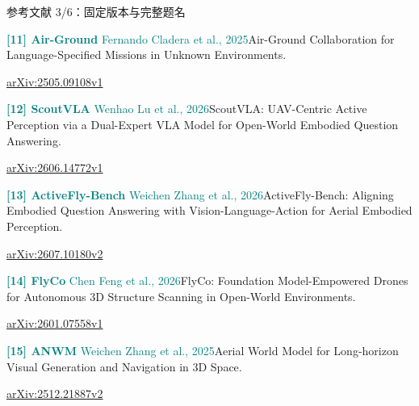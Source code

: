 \documentclass[aspectratio=169,10pt]{beamer}
\def\slidesource{}
\begin{document}
\begin{frame}[t,label=refs3]{参考文献 3/6：固定版本与完整题名}
\relax
{\fontsize{8.3}{10.6}\selectfont
\par\textcolor{teal}{\textbf{[11] Air-Ground} Fernando Cladera et al., 2025}\quad Air-Ground Collaboration for Language-Specified Missions in Unknown Environments.\par\href{https://arxiv.org/html/2505.09108v1}{arXiv:2505.09108v1}\par\vspace{1.8mm}
\par\textcolor{teal}{\textbf{[12] ScoutVLA} Wenhao Lu et al., 2026}\quad ScoutVLA: UAV-Centric Active Perception via a Dual-Expert VLA Model for Open-World Embodied Question Answering.\par\href{https://arxiv.org/html/2606.14772v1}{arXiv:2606.14772v1}\par\vspace{1.8mm}
\par\textcolor{teal}{\textbf{[13] ActiveFly-Bench} Weichen Zhang et al., 2026}\quad ActiveFly-Bench: Aligning Embodied Question Answering with Vision-Language-Action for Aerial Embodied Perception.\par\href{https://arxiv.org/html/2607.10180v2}{arXiv:2607.10180v2}\par\vspace{1.8mm}
\par\textcolor{teal}{\textbf{[14] FlyCo} Chen Feng et al., 2026}\quad FlyCo: Foundation Model-Empowered Drones for Autonomous 3D Structure Scanning in Open-World Environments.\par\href{https://arxiv.org/html/2601.07558v1}{arXiv:2601.07558v1}\par\vspace{1.8mm}
\par\textcolor{teal}{\textbf{[15] ANWM} Weichen Zhang et al., 2025}\quad Aerial World Model for Long-horizon Visual Generation and Navigation in 3D Space.\par\href{https://arxiv.org/html/2512.21887v2}{arXiv:2512.21887v2}\par\vspace{1.8mm}
}
\end{frame}
\gdef\slidesource{\href{https://arxiv.org/html/2605.15964v1}{[16] WorldVLN}；\href{https://arxiv.org/html/2606.06147v1}{[17] WorldFly}；\href{https://arxiv.org/html/2609.33581v1}{[18] ForeFly}；\href{https://arxiv.org/html/2606.01205v2}{[19] ImagineUAV}；\href{https://arxiv.org/html/2609.39763v1}{[20] DiffWAM}}
\end{document}
